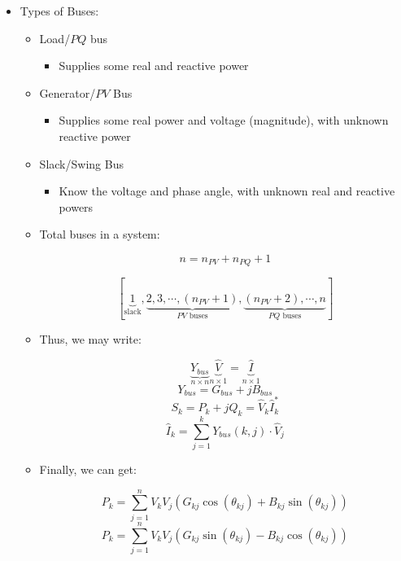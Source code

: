 \begin{itemize}
  \item Types of Buses:

    \begin{itemize}

      \item Load/$PQ$ bus

        \begin{itemize}

          \item Supplies some real and reactive power

        \end{itemize}

      \item Generator/$PV$ Bus

        \begin{itemize}

          \item Supplies some real power and voltage (magnitude), with unknown reactive power

        \end{itemize}

      \item Slack/Swing Bus

        \begin{itemize}

          \item Know the voltage and phase angle, with unknown real and reactive powers

        \end{itemize}

      \item Total buses in a system:

        $$n=n_{PV}+n_{PQ}+1$$

        $$\left[ \underbrace{1}_{\text{slack}}, \underbrace{2, 3, \cdots, (n_{PV}+1)}_{\text{$PV$ buses}}, \underbrace{(n_{PV}+2), \cdots, n}_{\text{$PQ$ buses}} \right]$$

      \item Thus, we may write:

        $$\underbrace{Y_{bus}}_{n\times n}\underbrace{\hat{V}}_{n\times 1}=\underbrace{\hat{I}}_{n\times 1}$$
        $$Y_{bus}=G_{bus}+jB_{bus}$$
        $$S_k=P_k+jQ_k=\hat{V}_k\hat{I}_k^*$$
        $$\hat{I}_k=\sum_{j=1}^k Y_{bus}(k,j)\cdot\hat{V}_j$$

      \item Finally, we can get:

        $$P_k=\sum_{j=1}^n V_kV_j\left( G_{kj}\cos(\theta_{kj})+B_{kj}\sin(\theta_{kj}) \right)$$
        $$P_k=\sum_{j=1}^n V_kV_j\left( G_{kj}\sin(\theta_{kj})-B_{kj}\cos(\theta_{kj}) \right)$$

    \end{itemize}

\end{itemize}



